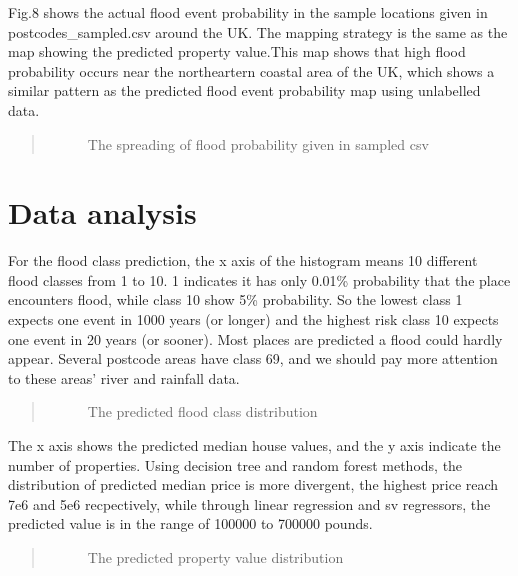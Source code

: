 \documentclass[letterpaper,10pt,english]{sphinxmanual}
\let\sphinxpxdimen\pdfpxdimen\else\newdimen\sphinxpxdimen
\begin{document}
\sphinxAtStartPar
Fig.8 shows the actual flood event probability in the sample locations given in postcodes\_sampled.csv around the UK. The mapping strategy is the same as the map showing the predicted property value.This map shows that high flood probability occurs near the north\sphinxhyphen{}eartern coastal area of the UK, which shows a similar pattern as the predicted flood event probability map using unlabelled data.
\begin{quote}

\begin{figure}[htbp]
\centering
\capstart

\noindent\sphinxincludegraphics[width=500\sphinxpxdimen]{{pic8}.png}
\caption{The spreading of flood probability given in sampled csv}\label{\detokenize{index:id14}}\end{figure}
\end{quote}


\chapter{Data analysis}
\label{\detokenize{index:data-analysis}}
\sphinxAtStartPar
For the flood class prediction, the x axis of the histogram means 10 different flood classes from 1 to 10. 1 indicates it has only 0.01\% probability that the place encounters flood, while class 10 show 5\% probability. So the lowest class 1 expects one event in 1000 years (or longer) and the highest risk class 10 expects one event in 20 years (or sooner). Most places are predicted a flood could hardly appear. Several postcode areas have class 6\sphinxhyphen{}9, and we should pay more attention to these areas’ river and rainfall data.
\begin{quote}

\begin{figure}[htbp]
\centering
\capstart

\noindent\sphinxincludegraphics[width=500\sphinxpxdimen]{{pic9}.png}
\caption{The predicted flood class distribution}\label{\detokenize{index:id15}}\end{figure}
\end{quote}

\sphinxAtStartPar
The x axis shows the predicted median house values, and the y axis indicate the number of properties. Using decision tree and random forest methods, the distribution of predicted median price is more divergent, the highest price reach 7e6 and 5e6 recpectively, while through linear regression and sv regressors, the predicted value is in the range of 100000 to 700000 pounds.
\begin{quote}

\begin{figure}[htbp]
\centering
\capstart

\noindent\sphinxincludegraphics[width=500\sphinxpxdimen]{{pic10}.png}
\caption{The predicted property value distribution}\label{\detokenize{index:id16}}\end{figure}
\end{quote}
\end{document}
